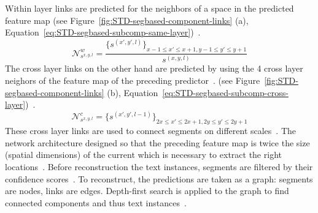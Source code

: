 Within layer links are predicted for the neighbors of a space in the predicted feature map
(see Figure~\ref{fig:STD-segbased-component-links} (a),
Equation~\ref{eq:STD-segbased-subcomp-same-layer})~\citep{shi_detecting_2017}.
\begin{equation}\label{eq:STD-segbased-subcomp-same-layer}
    \mathcal{N}_{s^{x,y,l}}^w =
        \frac{{\{s^{(x',y',l)}\}}_{x-1\leq x'\leq x+1,y-1\leq y'\leq y+1}}{s^{(x,y,l)}}
\end{equation}
The cross layer links on the other hand are predicted by using the 4 cross layer neighors of the
feature map of the preceding predictor~\citep{shi_detecting_2017}.
(see Figure~\ref{fig:STD-segbased-component-links} (b),
Equation~\ref{eq:STD-segbased-subcomp-cross-layer})~\citep{shi_detecting_2017}.
\begin{equation}\label{eq:STD-segbased-subcomp-cross-layer}
    \mathcal{N}_{s^{x,y,l}}^c = {\{s^{(x',y',l-1)}\}}_{2x\leq x'\leq 2x+1,2y\leq y'\leq 2y+1}
\end{equation}
These cross layer links are used to connect segments on different scales~\citep{shi_detecting_2017}.
The network architecture designed so that the preceding feature map is twice the size (spatial
dimensions) of the current which is necessary to extract the right
locations~\citep{shi_detecting_2017}.
Before reconstruction the text instances, segments are filtered by their confidence
scores~\citep{shi_detecting_2017}.
To reconstruct, the predictions are taken as a graph: segments are nodes, links are edges.
Depth-first search is applied to the graph to find connected components and thus text
instances~\citep{shi_detecting_2017}.

